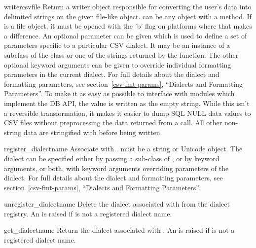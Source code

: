 \begin{funcdesc}{writer}{csvfile}
Return a writer object responsible for converting the user's data into
delimited strings on the given file-like object.   can be any
object with a  method.  If  is a file object,
it must be opened with the 'b' flag on platforms where that makes a
difference.  An optional
{} parameter can be given which is used to define a set of
parameters specific to a particular CSV dialect.  It may be an instance
of a subclass of the  class or one of the strings
returned by the  function.  The other optional
{} keyword arguments can be given to override individual
formatting parameters in the current dialect.  For full details
about the dialect and formatting parameters, see
section~\ref{csv-fmt-params}, ``Dialects and Formatting Parameters''.
To make it as easy as possible to
interface with modules which implement the DB API, the value
 is written as the empty string.  While this isn't a
reversible transformation, it makes it easier to dump SQL NULL data values
to CSV files without preprocessing the data returned from a
 call.  All other non-string data are stringified
with  before being written.
\end{funcdesc}

\begin{funcdesc}{register_dialect}{name}
Associate  with .   must be a string
or Unicode object. The dialect can be specified either by passing a
sub-class of , or by  keyword arguments,
or both, with keyword arguments overriding parameters of the dialect.
For full details about the dialect and formatting parameters, see
section~\ref{csv-fmt-params}, ``Dialects and Formatting Parameters''.
\end{funcdesc}

\begin{funcdesc}{unregister_dialect}{name}
Delete the dialect associated with  from the dialect registry.  An
 is raised if  is not a registered dialect
name.
\end{funcdesc}

\begin{funcdesc}{get_dialect}{name}
Return the dialect associated with .  An  is
raised if  is not a registered dialect name.
\end{funcdesc}

